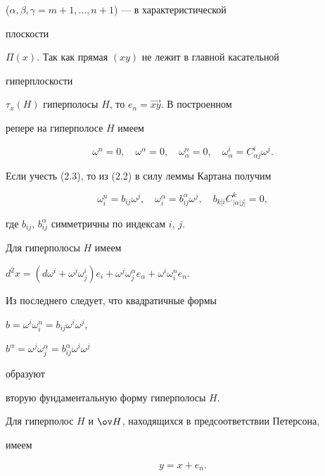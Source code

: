 ($\alpha,\beta,\gamma=m+1,\dotsc,n+1$) --- в характеристической 


плоскости 


$\Pi(x)$. Так как прямая $(xy)$ не лежит в главной касательной 


гиперплоскости 


$\tau_x(H)$ гиперполосы $H$, то $e_n=\overrightarrow{xy}$. В построенном 


репере на гиперполосе $H$ имеем 


\begin{equation} 


\omega^n=0,\quad \omega^\alpha=0,\quad 


\omega^n_\alpha=0,\quad \omega^i_\alpha=C^i_{\alpha j}\omega^j. 


\end{equation} 


Если учесть (2.3), то из (2.2) в силу леммы Картана получим 


\begin{equation} 


\omega^n_i=b_{ij}\omega^j,\quad \omega^\alpha_i= 


b^\alpha_{ij}\omega^j,\quad 


b_{k[i}C^k_{|\alpha|j]}=0, 


\end{equation} 


где $b_{ij}$, $b^\alpha_{ij}$ симметричны по индексам $i$, $j$. 


 


Для гиперполосы $H$ имеем 


$d^2x=(d\omega^i+\omega^j\omega^i_j)e_i+\omega^j\omega^\alpha_j 


e_\alpha+\omega^i\omega^n_i e_n$. 


Из последнего следует, что квадратичные формы 


$b=\omega^i\omega^n_i=b_{ij}\omega^i\omega^j$, 


$b^\alpha=\omega^j\omega^\alpha_j=b^\alpha_{ij}\omega^i\omega^j$ 


образуют 


вторую фундаментальную форму гиперполосы $H$. 


 


Для гиперполос $H$ и $\ov H$, находящихся в предсоответствии Петерсона, 


имеем 


\begin{equation} 


y=x+e_n.


\end{equation} 


